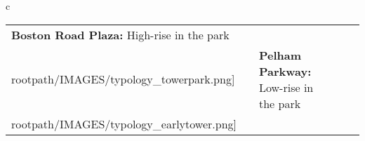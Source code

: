 \begin{table}[H]
        \begin{tabular}{c}
        \begin{tabular}{m{1.25in} m{2in} m{.1in} m{1.25in} m{2in}}
\textbf{Boston Road Plaza:} {High-rise in the park} & \texttt{[image: \\rootpath/IMAGES/typology\_towerpark.png]} & & \textbf{Pelham Parkway:} {Low-rise in the park} & \texttt{[image: \\rootpath/IMAGES/typology\_earlytower.png]}
\end{tabular}\end{tabular}
        \end{table}